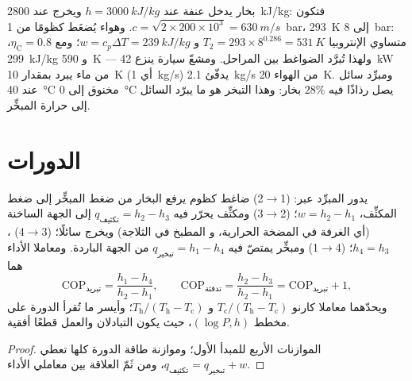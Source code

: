 \begin{example}\label{ex:b2:open-systems:numbers}
بخار يدخل  عنفة عند $h = \qty{3000}{kJ/kg}$ ويخرج
عند \qty{2800}{kJ/kg}: فتكون $c = \sqrt{2 \times 200 \times 10^3} =
\qty{630}{m/s}$. وهواء يُضغَط كظومًا من \qty{1}{bar}،
\qty{293}{K} إلى \qty{8}{bar}: متساوي الإنتروبيا $T_2 = 293 \times 8^{0.286} =
\qty{531}{K}$ و $w = c_p\Delta T = \qty{239}{kJ/kg}$؛ ومع $\eta_{\text{C}} =
0.8$، \qty{299}{kJ/kg} و \qty{590}{K} --- ولهذا تُبرَّد الضواغط
بين المراحل. ومشعّ سيارة ينزع \qty{42}{kW} من ماء يبرد
بمقدار \qty{10}{K} (أي \qty{1}{kg/s}) يدفّئ \qty{2.1}{kg/s} من الهواء
\qty{20}{K}. ومبرِّد سائل عند \qty{40}{\celsius} مخنوق إلى
\qty{0}{\celsius} يصل رذاذًا فيه $28\%$ بخار: وهذا التبخر
هو ما يبرّد السائل إلى حرارة المبخِّر.
\end{example}

\section{الدورات}

\begin{proposition}\label{prop:b2:open-systems:fridge}
يدور المبرِّد عبر: (1$\to$2) ضاغط كظوم
يرفع البخار من ضغط المبخِّر إلى ضغط
المكثِّف، $w = h_2 - h_1$؛ (2$\to$3) ومكثِّف يحرّر فيه
$q_{\text{تكثيف}} = h_2 - h_3$ إلى الجهة الساخنة (أي الغرفة في المضخة الحرارية، و
المطبخ في الثلاجة) ويخرج سائلًا؛ (3$\to$4) ، $h_4
= h_3$؛ (4$\to$1) ومبخِّر يمتصّ فيه $q_{\text{تبخير}} = h_1 - h_4$
من الجهة الباردة. ومعاملا الأداء هما
\[
\mathrm{COP}_{\text{تبريد}} = \frac{h_1 - h_4}{h_2 - h_1}, \qquad
\mathrm{COP}_{\text{تدفئة}} = \frac{h_2 - h_3}{h_2 - h_1} = \mathrm{COP}_{\text{تبريد}} + 1 ,
\]
ويحدّهما معاملا كارنو $T_{\text{c}}/(T_{\text{h}} - T_{\text{c}})$ و
$T_{\text{h}}/(T_{\text{h}} - T_{\text{c}})$؛ وأيسر ما تُقرأ الدورة على
مخطط $(\log P, h)$، حيث يكون التبادلان والعمل قطعًا
أفقية.
\end{proposition}

\begin{proof}
الموازنات الأربع للمبدأ الأول؛ وموازنة طاقة الدورة كلها
تعطي $q_{\text{تكثيف}} = q_{\text{تبخير}} + w$، ومن ثَمّ العلاقة بين
معاملي الأداء.
\end{proof}

